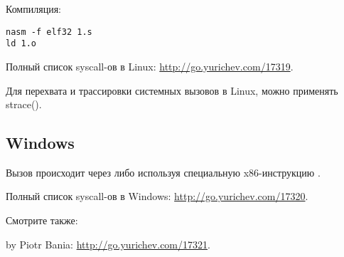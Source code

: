 Компиляция:

\begin{lstlisting}
nasm -f elf32 1.s
ld 1.o
\end{lstlisting}

Полный список syscall-ов в Linux: \url{http://go.yurichev.com/17319}.

Для перехвата и трассировки системных вызовов в Linux, можно применять strace().

\subsection{Windows}


Вызов происходит через  
либо используя специальную x86-инструкцию .

Полный список syscall-ов в Windows: \url{http://go.yurichev.com/17320}.

Смотрите также:

 by Piotr Bania: \url{http://go.yurichev.com/17321}.

